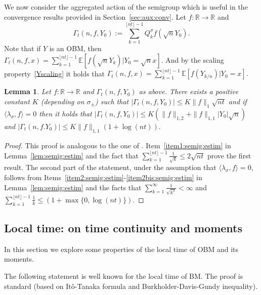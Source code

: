 \documentclass[12pt]{article}
\numberwithin{equation}{section}
\newtheorem{lemma}{Lemma}
\theoremstyle{definition}
\theoremstyle{remark}
\newcommand{\RR}{\mathbb{R}}
\newcommand{\EE}{\mathbb{E}}
\begin{document}
We now consider the aggregated action of the semigroup which is useful in the convergence results provided in Section~\ref{sec:aux:conv}.
Let $f\colon \RR \to \RR$ and
\[
	\Gamma_t(n,f, Y_0) 
	:= %
	\sum_{k=1}^{\lfloor n t \rfloor -1} Q^\sigma_k f (\sqrt{n} Y_0).
\] 
Note that if $Y$ is an OBM, then
$\Gamma_t(n,f,x) 
	= \sum_{k=1}^{\lfloor n t \rfloor -1} \EE\left[ f(\sqrt{n} Y_k) | Y_0=\sqrt{n} x\right].
$
And by the scaling property~\eqref{Yscaling} it holds that
$
	\Gamma_t(n,f,x) = \sum_{k=1}^{\lfloor n t \rfloor -1} \EE\left[ f(Y_{k/n}) | Y_0=x\right].
$

\begin{lemma} \label{lem:j1:3.3}
Let $f\colon \RR \to \RR$ and
$
	\Gamma_t(n,f, Y_0) 
$
as above.
There exists a positive constant $K$ (depending on $\sigma_\pm$) such that
$|\Gamma_t(n,f,Y_0)| \leq K \|f\|_{1} {\sqrt{n t}}$
and if $\langle \lambda_\sigma , f \rangle=0$ then it holds that
$ |\Gamma_t(n,f,Y_0)| \leq K \left( \| f \|_{1,2} + \| f \|_{1,1} |Y_0| {\sqrt{n}}\right)$ 
and
$
|\Gamma_t(n,f.Y_0)| \leq K \| f \|_{1,1} (1+ \log(n t)).
$
\end{lemma}
%
%
%
\begin{proof}
This proof is analogous to the one of \cite[Lemma~3.3]{j1}.
Item~\ref{item1:semig:estim} in Lemma~\ref{lem:semig:estim} and the fact that
$ \sum_{k=1}^{\lfloor n t \rfloor -1}\frac{1}{\sqrt{k}} \leq 2  \sqrt{n t}$ prove the first result.
The second part of the statement, under the assumption that $\langle \lambda_\sigma , f \rangle=0$, follows from Items~\ref{item2:semig:estim}-\ref{item2bis:semig:estim} in Lemma~\ref{lem:semig:estim} and the facts that $ \sum_{k=1}^{\infty}\frac{1}{\sqrt{k^3}} <\infty$ and
$ \sum_{k=1}^{\lfloor n t \rfloor -1} \frac1k \leq (1+\max\{0,\log(nt)\})$. 
\end{proof}




\subsection{Local time: on time continuity and moments}
In this section we explore some properties of the local time of OBM and its moments.

The following statement is well known for the local time of BM. The proof is standard (based on It\^o-Tanaka formula and Burkholder-Davis-Gundy inequality). %
\end{document}
